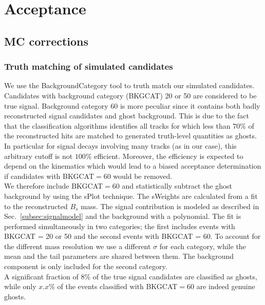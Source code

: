 \section{Acceptance}
\label{sec:Acceptance}

\subsection{MC corrections}

\subsubsection{Truth matching of simulated candidates}

We use the \textsf{BackgroundCategory} tool to truth match our simulated candidates. 
Candidates with background category (\textsf{BKGCAT}) 20 or 50 are considered to be true signal. 
Background category 60 is more peculiar since it contains both badly reconstructed
signal candidates and ghost background.
This is due to the fact that the classification algorithms identifies all tracks 
for which less than $70\%$ of the reconstructed hits are matched to generated truth-level quantities as ghosts.
In particular for signal decays involving many tracks (as in our case),
this arbitrary cutoff is not $100\%$ efficient.
Moreover, the efficiency is expected to depend on the kinematics which would lead to a biased acceptance determination
if candidates with \textsf{BKGCAT}$=60$ would be removed. \\
We therefore include \textsf{BKGCAT}$=60$ and statistically subtract the ghost background by using the \textsf{sPlot} technique.
The \textsf{sWeights} are calculated from a fit to the reconstructed $B_s$ mass.  
The signal contribution is modeled as described in Sec.~\ref{subsec:signalmodel} and the background with a polynomial.
The fit is performed simultaneously in two categories; the first includes events with \textsf{BKGCAT} = 20 or 50 and
the second events with \textsf{BKGCAT}  = 60.
To account for the different mass resolution we use a different $\sigma$ for each category,
while the mean and the tail parameters are shared between them. 
The background component is only included for the second category.
\\
A significant fraction of $8\%$ of the true signal candidates are classified as ghosts,
while only $x.x \%$ of the events classified with \textsf{BKGCAT}$=60$ are indeed genuine ghosts.




